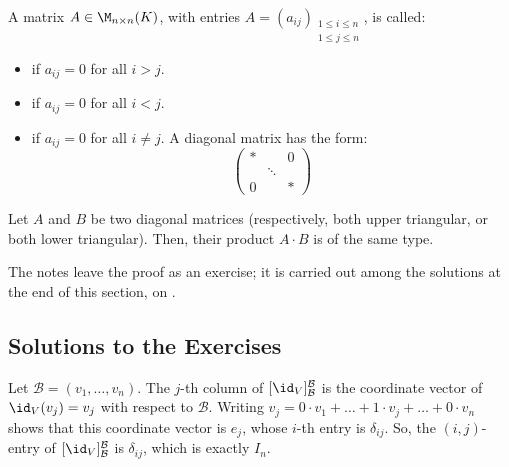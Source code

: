 \begin{definition}
\label{def:triangular_diagonal_matrices}
A matrix $A \in \M_{n \times n}(K)$, with entries $A = (a_{ij})_{\substack{1 \le i \le n \\ 1 \le j \le n}}$, is called:
\begin{itemize}
    \item {} if $a_{ij} = 0$ for all $i > j$.
    \item {} if $a_{ij} = 0$ for all $i < j$.
    \item {} if $a_{ij} = 0$ for all $i \neq j$. A diagonal matrix has the form:
    \begin{equation*}
        \begin{pmatrix} * & & 0 \\ & \ddots & \\ 0 & & * \end{pmatrix}
    \end{equation*}
\end{itemize}
\end{definition}

\begin{lemma}
\label{lemma:triangular_multiplication_closure}
Let $A$ and $B$ be two diagonal matrices (respectively, both upper triangular, or both lower triangular). Then, their product $A \cdot B$ is of the same type.
\end{lemma}

The notes leave the proof as an exercise; it is carried out among the solutions
at the end of this section, on .

\subsection{Solutions to the Exercises}
\label{sec:solutions_matrix_multiplication}

\begin{exercisesolution}
\label{sol:identity_represents_id}
Let $\mathcal{B} = (v_1, \dots, v_n)$. The $j$-th column of $[\id_V]_{\mathcal{B}}^{\mathcal{B}}$ is the coordinate vector of $\id_V(v_j) = v_j$ with respect to $\mathcal{B}$. Writing $v_j = 0 \cdot v_1 + \dots + 1 \cdot v_j + \dots + 0 \cdot v_n$ shows that this coordinate vector is $e_j$, whose $i$-th entry is $\delta_{ij}$. So, the $(i,j)$-entry of $[\id_V]_{\mathcal{B}}^{\mathcal{B}}$ is $\delta_{ij}$, which is exactly $I_n$.
\end{exercisesolution}

